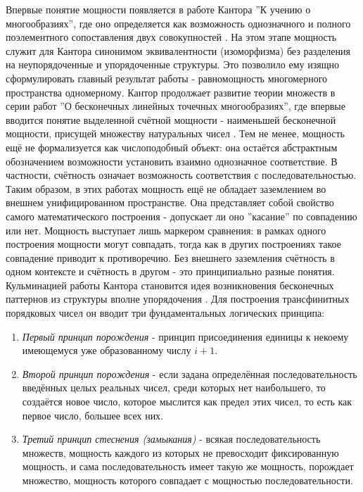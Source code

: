 \documentclass[12pt]{article}
\begin{document}
Впервые понятие мощности появляется в работе Кантора ''К учению о многообразиях'', где оно определяется как возможность однозначного и полного поэлементного сопоставления двух совокупностей \cite{cantor-power}. На этом этапе мощность служит для Кантора синонимом эквивалентности (изоморфизма) без разделения на неупорядоченные и упорядоченные структуры. Это позволило ему изящно сформулировать главный результат работы - равномощность многомерного пространства одномерному. Кантор продолжает развитие теории множеств в серии работ ''О бесконечных линейных точечных многообразиях'', где впервые вводится понятие выделенной счётной мощности - наименьшей бесконечной мощности, присущей множеству натуральных чисел \cite{cantor-countability}. Тем не менее, мощность ещё не формализуется как числоподобный объект: она остаётся абстрактным обозначением возможности установить взаимно однозначное соответствие. В частности, счётность означает возможность соответствия с последовательностью. Таким образом, в этих работах мощность ещё не обладает заземлением во внешнем унифицированном пространстве. Она представляет собой свойство самого математического построения - допускает ли оно ''касание'' по совпадению или нет. Мощность выступает лишь маркером сравнения: в рамках одного построения мощности могут совпадать, тогда как в других построениях такое совпадение приводит к противоречию. Без внешнего заземления счётность в одном контексте и счётность в другом - это принципиально разные понятия. Кульминацией работы Кантора становится идея возникновения бесконечных паттернов из структуры вполне упорядочения \cite{cantor-ordinality}. Для построения трансфинитных порядковых чисел он вводит три фундаментальных логических принципа:

\begin{enumerate}
    \item {\it Первый принцип порождения} - принцип присоединения единицы к некоему имеющемуся уже образованному числу $i + 1$.
    \item {\it Второй принцип порождения} - если задана определённая последовательность введённых целых реальных чисел, среди которых нет наибольшего, то создаётся новое число, которое мыслится как предел этих чисел, то есть как первое число, большее всех них.
    \item {\it Третий принцип стеснения (замыкания)} - всякая последовательность множеств, мощность каждого из которых не превосходит фиксированную мощность, и сама последовательность имеет такую же мощность, порождает множество, мощность которого совпадает с мощностью последовательности.
\end{enumerate}
\end{document}
